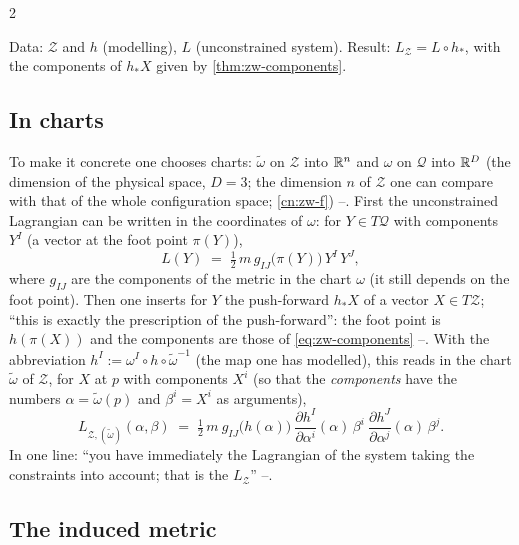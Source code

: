 \begin{paracol}{2}
\begin{recall}\label{rec:zw-recipe}
Data: $\mathcal Z$ and $h$ (modelling), $L$ (unconstrained system). Result: $L_{\mathcal Z}=L\circ h_*$, with the components of $h_*X$ given by \cref{thm:zw-components}.
\end{recall}

\subsection{In charts}\label{ssec:zw-charts}

To make it concrete one chooses charts: $\tilde\omega$ on $\mathcal Z$ into $\mathbb{R}^n$ and $\omega$ on $\mathcal Q$ into $\mathbb{R}^D$ (the dimension of the physical space, $D=3$; the dimension $n$ of $\mathcal Z$ one can compare with that of the whole configuration space; \cref{cn:zw-f}) --. First the unconstrained Lagrangian can be written in the coordinates of $\omega$: for $Y\in T\mathcal Q$ with components $Y^I$ (a vector at the foot point $\pi(Y)$),
\[
  L(Y)\;=\;\tfrac12\,m\,g_{IJ}\bigl(\pi(Y)\bigr)\,Y^I\,Y^J ,
\]
where $g_{IJ}$ are the components of the metric in the chart $\omega$ (it still depends on the foot point). Then one inserts for $Y$ the push-forward $h_*X$ of a vector $X\in T\mathcal Z$; ``this is exactly the prescription of the push-forward'': the foot point is $h(\pi(X))$ and the components are those of \eqref{eq:zw-components} --. With the abbreviation $h^I:=\omega^I\circ h\circ\tilde\omega^{-1}$ (the map one has modelled), this reads in the chart $\tilde\omega$ of $\mathcal Z$, for $X$ at $p$ with components $X^i$ (so that the \emph{components} have the numbers $\alpha=\tilde\omega(p)$ and $\beta^i=X^i$ as arguments),
\begin{equation}\label{eq:zw-LZchart}
  L_{\mathcal Z,(\tilde\omega)}(\alpha,\beta)\;=\;\tfrac12\,m\ g_{IJ}\bigl(h(\alpha)\bigr)\ \frac{\partial h^I}{\partial\alpha^i}(\alpha)\,\beta^i\ \frac{\partial h^J}{\partial\alpha^j}(\alpha)\,\beta^j .
\end{equation}
In one line: ``you have immediately the Lagrangian of the system taking the constraints into account; that is the $L_{\mathcal Z}$'' --.

\subsection{The induced metric}\label{ssec:zw-metric}


\end{paracol}
